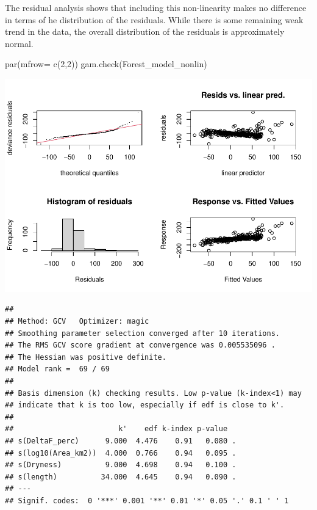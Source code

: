 \documentclass[]{elsarticle} %
\newenvironment{Shaded}{\begin{snugshade}}{\end{snugshade}}
\newcommand{\AttributeTok}[1]{\textcolor[rgb]{0.77,0.63,0.00}{#1}}
\newcommand{\DecValTok}[1]{\textcolor[rgb]{0.00,0.00,0.81}{#1}}
\newcommand{\FunctionTok}[1]{\textcolor[rgb]{0.00,0.00,0.00}{#1}}
\newcommand{\NormalTok}[1]{#1}
\begin{document}
The residual analysis shows that including this non-linearity makes no difference in terms of he distribution of the residuals. While there is some remaining weak trend in the data, the overall distribution of the residuals is approximately normal.

\begin{Shaded}
\begin{Highlighting}[]
\FunctionTok{par}\NormalTok{(}\AttributeTok{mfrow=} \FunctionTok{c}\NormalTok{(}\DecValTok{2}\NormalTok{,}\DecValTok{2}\NormalTok{))}
\FunctionTok{gam.check}\NormalTok{(Forest\_model\_nonlin)}
\end{Highlighting}
\end{Shaded}

\includegraphics{SupplementaryMaterialPart3_files/figure-latex/unnamed-chunk-11-1.pdf}

\begin{verbatim}
## 
## Method: GCV   Optimizer: magic
## Smoothing parameter selection converged after 10 iterations.
## The RMS GCV score gradient at convergence was 0.005535096 .
## The Hessian was positive definite.
## Model rank =  69 / 69 
## 
## Basis dimension (k) checking results. Low p-value (k-index<1) may
## indicate that k is too low, especially if edf is close to k'.
## 
##                        k'    edf k-index p-value  
## s(DeltaF_perc)      9.000  4.476    0.91   0.080 .
## s(log10(Area_km2))  4.000  0.766    0.94   0.095 .
## s(Dryness)          9.000  4.698    0.94   0.100 .
## s(length)          34.000  4.645    0.94   0.090 .
## ---
## Signif. codes:  0 '***' 0.001 '**' 0.01 '*' 0.05 '.' 0.1 ' ' 1
\end{verbatim}

\renewcommand\refname{References}

\end{document}
